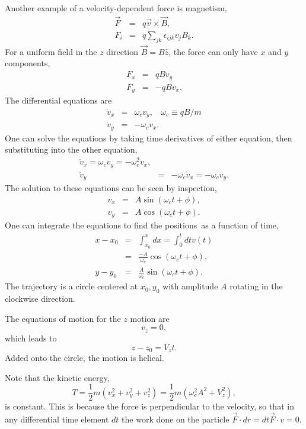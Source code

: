 Another example of a velocity-dependent force is magnetism,
\begin{eqnarray}
\vec{F}&=&q\vec{v}\times\vec{B},\\
\nonumber
F_i&=&q\sum_{jk}\epsilon_{ijk}v_jB_k.
\end{eqnarray}
For a uniform field in the $z$ direction $\vec{B}=B\hat{z}$, the force can only have $x$ and $y$ components,
\begin{eqnarray}
F_x&=&qBv_y\\
\nonumber
F_y&=&-qBv_x.
\end{eqnarray}
The differential equations are
\begin{eqnarray}
\dot{v}_x&=&\omega_c v_y,~~~~\omega_c\equiv qB/m\\
\nonumber
\dot{v}_y&=&-\omega_c v_x.
\end{eqnarray}
One can solve the equations by taking time derivatives of either equation, then substituting into the other equation,
\begin{eqnarray}
\ddot{v}_x=\omega_c\dot{v_y}=-\omega_c^2v_x,\\
\nonumber
\ddot{v}_y&=&-\omega_c\dot{v}_x=-\omega_cv_y.
\end{eqnarray}
The solution to these equations can be seen by inspection,
\begin{eqnarray}
v_x&=&A\sin(\omega_ct+\phi),\\
\nonumber
v_y&=&A\cos(\omega_ct+\phi).
\end{eqnarray}
One can integrate the equations to find the positions\ as a function of time,
\begin{eqnarray}
x-x_0&=&\int_{x_0}^x dx=\int_0^t dt v(t)\\
\nonumber
&=&\frac{-A}{\omega_c}\cos(\omega_ct+\phi),\\
\nonumber
y-y_0&=&\frac{A}{\omega_c}\sin(\omega_ct+\phi).
\end{eqnarray}
The trajectory is a circle centered at $x_0,y_0$ with amplitude $A$ rotating in the clockwise direction.

The equations of motion for the $z$ motion are
\begin{equation}
\dot{v_z}=0,
\end{equation}
which leads to
\begin{equation}
z-z_0=V_zt.
\end{equation}
Added onto the circle, the motion is helical.

Note that the kinetic energy,
\begin{equation}
T=\frac{1}{2}m(v_x^2+v_y^2+v_z^2)=\frac{1}{2}m(\omega_c^2A^2+V_z^2),
\end{equation}
is constant. This is because the force is perpendicular to the velocity, so that in any differential time element $dt$ the work done on the particle $\vec{F}\cdot{dr}=dt\vec{F}\cdot{v}=0$.

